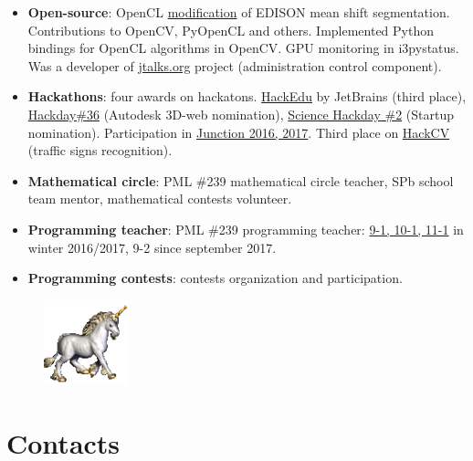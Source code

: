 \documentclass[11pt,oneside]{article}
\newcommand{\hhref}[2]{\href{#1}{\color{blue}#2}}
\begin{document}
\begin{itemize}
    \item{\textbf{Open-source}: OpenCL \hhref{https://github.com/PolarNick239/OpenMeanShift}{modification} of EDISON mean shift segmentation. Contributions to OpenCV, PyOpenCL and others. Implemented Python bindings for OpenCL algorithms in OpenCV. GPU monitoring in i3pystatus. Was a developer of \hhref{http://jtalks.org/}{jtalks.org} project (administration control component)}.
    
    \item{\textbf{Hackathons}}: four awards on hackatons. \hhref{https://www.hackerleague.org/hackathons/jetbrains-edtech-hackathon/blogposts/53655896e24d32cfbd000006}{HackEdu} by JetBrains (third place), \hhref{http://hackday.ru/hackday-36/projects\#project-1121}{Hackday\#36} (Autodesk 3D-web nomination), \hhref{http://hackday.ru/sciencehackday-2/projects\#project-1400}{Science Hackday \#2} (Startup nomination). Participation in \hhref{http://www.hackjunction.com/}{Junction 2016, 2017}. Third place on \hhref{https://career.luxoft.com/lp/hack-cv/}{HackCV} (traffic signs recognition).
    
    \item{\textbf{Mathematical circle}}: PML \#239 mathematical circle teacher, SPb school team mentor, mathematical contests volunteer.
    
    \item{\textbf{Programming teacher}}: PML \#239 programming teacher: \hhref{http://polarnick239.github.io/239/201612}{9-1, 10-1, 11-1} in winter 2016/2017, 9-2 since september 2017.
    
    \item{\textbf{Programming contests}}: contests organization and participation.
\end{itemize}

\begin{figure}
    \centering
    \includegraphics[width=0.22\textwidth]{unicorn.png}
\end{figure}

\vspace{-9pt}
\section*{\textbf{Contacts}}
\vspace{-9pt}
\end{document}
